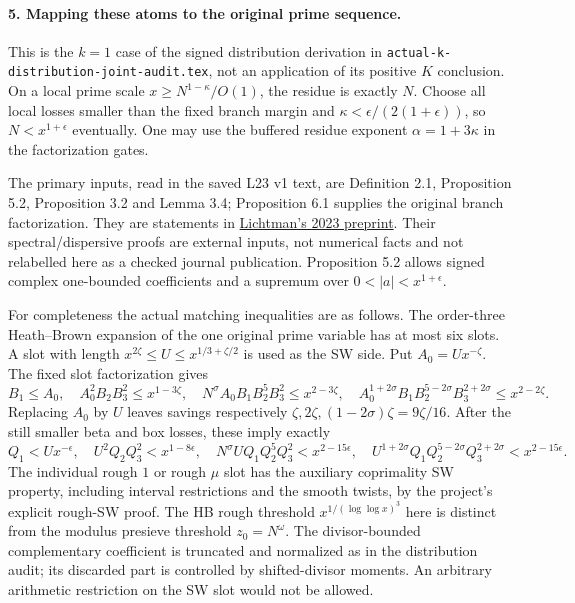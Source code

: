 \paragraph{5. Mapping these atoms to the original prime sequence.}
This is the \(k=1\) case of the signed distribution derivation in
\texttt{actual-k-distribution-joint-audit.tex}, not an application
of its positive \(K\) conclusion. On a local prime scale
\(x\ge N^{1-\kappa}/O(1)\), the residue is exactly \(N\).
Choose all local losses smaller than the fixed branch margin and
\(\kappa<\epsilon/(2(1+\epsilon))\), so \(N<x^{1+\epsilon}\)
eventually. One may use the buffered residue exponent
\(\alpha=1+3\kappa\) in the factorization gates.

The primary inputs, read in the saved L23 v1 text, are Definition 2.1,
Proposition 5.2, Proposition 3.2 and Lemma 3.4; Proposition 6.1 supplies
the original branch factorization. They are statements in
\href{https://arxiv.org/abs/2309.08522v1}{Lichtman's 2023 preprint}.
Their spectral/dispersive proofs are external inputs, not numerical
facts and not relabelled here as a checked journal publication.
Proposition 5.2 allows signed complex one-bounded coefficients and
a supremum over \(0<|a|<x^{1+\epsilon}\).

For completeness the actual matching inequalities are as follows.
The order-three Heath--Brown expansion of the one original prime
variable has at most six slots. A slot with length
\(x^{2\zeta}\le U\le x^{1/3+\zeta/2}\) is used as the SW side.
Put \(A_0=Ux^{-\zeta}\). The fixed slot factorization gives
\[
 B_1\le A_0,\quad A_0^2B_2B_3^2\le x^{1-3\zeta},\quad
 N^\sigma A_0B_1B_2^5B_3^2\le x^{2-3\zeta},\quad
 A_0^{1+2\sigma}B_1B_2^{5-2\sigma}B_3^{2+2\sigma}
       \le x^{2-2\zeta}.
\]
Replacing \(A_0\) by \(U\) leaves savings respectively
\(\zeta,2\zeta,(1-2\sigma)\zeta=9\zeta/16\).
After the still smaller beta and box losses, these imply exactly
\[
 Q_1<Ux^{-\epsilon},\quad U^2Q_2Q_3^2<x^{1-8\epsilon},\quad
 N^\sigma UQ_1Q_2^5Q_3^2<x^{2-15\epsilon},\quad
 U^{1+2\sigma}Q_1Q_2^{5-2\sigma}Q_3^{2+2\sigma}<x^{2-15\epsilon}.
\]
The individual rough \(1\) or rough \(\mu\) slot has the auxiliary
coprimality SW property, including interval restrictions and the
smooth twists, by the project's explicit rough-SW proof. The
HB rough threshold \(x^{1/(\log\log x)^3}\) here is distinct from
the modulus presieve threshold \(z_0=N^\omega\).
The
divisor-bounded complementary coefficient is truncated and normalized
as in the distribution audit; its discarded part is controlled by
shifted-divisor moments. An arbitrary arithmetic restriction on the
SW slot would not be allowed.


